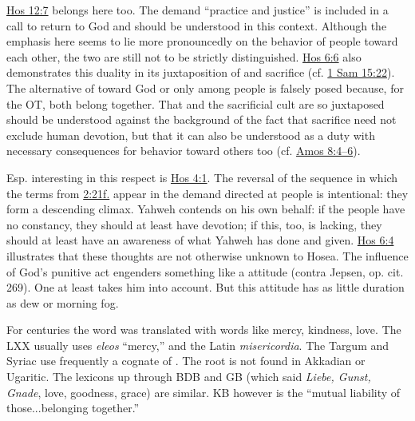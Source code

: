 \begin{compactdesc}
\begin{compactdesc}
								\hyperref[HOSEA-12-7]{Hos 12:7} belongs here too. The demand ``practice  and justice'' is included in a call to return to God and should be understood in this context. Although the emphasis here seems to lie more pronouncedly on the behavior of people toward each other, the two are still not to be strictly distinguished. \hyperref[HOSEA-6-6]{Hos 6:6} also demonstrates this duality in its juxtaposition of  and sacrifice (cf. \hyperref[1SAMUEL-15-22]{1 Sam 15:22}). The alternative of  toward God or only among people is falsely posed because, for the OT, both belong together. That  and the sacrificial cult are so juxtaposed should be understood against the background of the fact that sacrifice need not exclude human devotion, but that it can also be understood as a duty with necessary consequences for behavior toward others too (cf. \hyperref[AMOS-8-4]{Amos 8:4--6}). 

								Esp. interesting in this respect is \hyperref[HOSEA-4-1]{Hos 4:1}. The reversal of the sequence in which the terms from \hyperref[HOSEA-2-21]{2:21f.} appear in the demand directed at people is intentional: they form a descending climax. Yahweh contends on his own behalf: if the people have no constancy, they should at least have  devotion; if this, too, is lacking, they should at least have an awareness of what Yahweh has done and given. \hyperref[HOSEA-6-4]{Hos 6:4} illustrates that these thoughts are not otherwise unknown to Hosea. The influence of God's punitive act engenders something like a  attitude (contra Jepsen, op. cit. 269). One at least takes him into account. But this attitude has as little duration as dew or morning fog. 
						\end{compactdesc}
					\item[TWOT] \phantom{.}
						\begin{compactdesc}
							\item[305--306] For centuries the word  was translated with words like mercy, kindness, love. The LXX usually uses \textit{eleos} ``mercy,'' and the Latin \textit{misericordia}. The Targum and Syriac use frequently a cognate of . The root is not found in Akkadian or Ugaritic. The lexicons up through BDB and GB (which said \textit{Liebe, Gunst, Gnade}, love, goodness, grace) are similar. KB however is the ``mutual liability of those...belonging together.''


\end{compactdesc}
\end{compactdesc}
